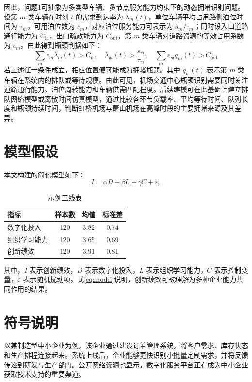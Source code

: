 \documentclass[UTF8,a4paper,11pt,onecolumn,fontset=none]{ctexart}
\begin{document}
因此，问题1可抽象为多类型车辆、多节点服务能力约束下的动态拥堵识别问题。设第 $m$ 类车辆在时刻 $t$ 的需求到达率为 $\lambda_m(t)$，单位车辆平均占用路侧泊位时间为 $\tau_m$，可用泊位数为 $s_m$，对应泊位服务能力可表示为 $s_m/\tau_m$；同时设入口道路通行能力为 $C_{\mathrm{in}}$，出口疏散能力为 $C_{\mathrm{out}}$，第 $m$ 类车辆对道路资源的等效占用系数为 $e_m$。由此得到瓶颈判据如下：
\[
  \sum_m e_m\lambda_m(t)>C_{\mathrm{in}},\quad
  \lambda_m(t)>\frac{s_m}{\tau_m},\quad
  \sum_m e_m q_m(t)>C_{\mathrm{out}}
\]
若上述任一条件成立，相应位置便可能成为拥堵瓶颈。其中 $q_m(t)$ 表示第 $m$ 类车辆在系统内的排队或等待规模。由此可见，机场交通中心瓶颈识别需要同时关注道路通行能力、泊位周转能力和车辆供需匹配程度。后续建模可在此基础上建立排队网络模型或离散时间仿真模型，通过比较各环节负载率、平均等待时间、队列长度和瓶颈持续时间，判断虹桥机场与萧山机场在高峰时段的主要拥堵来源及其差异。


\section{模型假设}
本文构建的简化模型如下：
\begin{equation}
  I = \alpha D + \beta L + \gamma C + \varepsilon,
  \label{eq:model}
\end{equation}
\begin{table}[htbp]
  \centering
  \caption{示例三线表}
  \label{tab:sample-three-line}
  \begin{tabular}{lccc}
    \toprule
    指标 & 样本数 & 均值 & 标准差 \\
    \midrule
    数字化投入 & 120 & 3.82 & 0.74 \\
    组织学习能力 & 120 & 3.65 & 0.69 \\
    创新绩效 & 120 & 3.91 & 0.81 \\
    \bottomrule
  \end{tabular}
\end{table}
其中，$I$ 表示创新绩效，$D$ 表示数字化投入，$L$ 表示组织学习能力，$C$ 表示控制变量，$\varepsilon$ 表示随机扰动项。式\eqref{eq:model}说明，创新绩效可被理解为多种企业能力共同作用的结果。

\section{符号说明}
以某制造型中小企业为例，该企业通过建设订单管理系统，将客户需求、库存状态和生产排程连接起来。系统上线后，企业能够更快识别小批量定制需求，并将反馈传递到研发与生产部门。公开网络资源也显示，数字化服务平台正在成为中小企业获取技术支持的重要渠道\cite{miit-online}。
\end{document}
